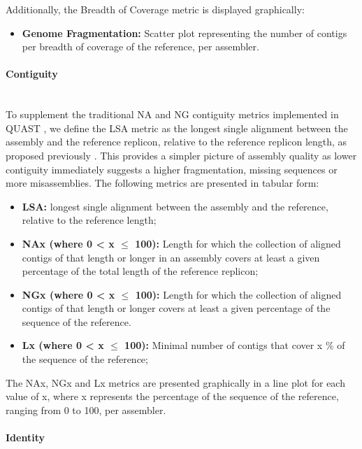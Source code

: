 Additionally, the Breadth of Coverage metric is displayed graphically:

\begin{itemize}
    \item \textbf{Genome Fragmentation:} Scatter plot representing the number of contigs per breadth of coverage of the reference, per assembler.
\end{itemize}

\paragraph{Contiguity} \mbox{}\\

To supplement the traditional NA and NG contiguity metrics implemented in QUAST \cite{gurevich_quast_2013}, we define the LSA metric as the longest single alignment between the assembly and the reference replicon, relative to the reference replicon length, as proposed previously \cite{wick_benchmarking_2021}. This provides a simpler picture of assembly quality as lower contiguity immediately suggests a higher fragmentation, missing sequences or more misassemblies. The following metrics are presented in tabular form:


\begin{itemize}
    \item \textbf{LSA:} longest single alignment between the assembly and the reference, relative to the reference length;
    \item \textbf{NAx (where 0  < x  $\leq$ 100):} Length for which the collection of aligned contigs of that length or longer in an assembly covers at least a given percentage of the total length of the reference replicon;
    \item \textbf{NGx (where 0  < x  $\leq$ 100):} Length for which the collection of aligned contigs of that length or longer covers at least a given percentage of the sequence of the reference.
    \item \textbf{Lx (where 0  < x  $\leq$ 100):} Minimal number of contigs that cover x \% of the sequence of the reference;
\end{itemize}

The NAx, NGx and Lx metrics are presented graphically in a line plot for each value of x, where x represents the percentage of the sequence of the reference, ranging from 0 to 100, per assembler.  

\paragraph{Identity} \mbox{}\\

